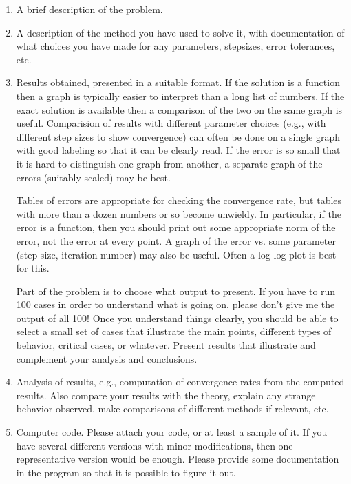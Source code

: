 \documentclass{article}
\begin{document}
\vskip 5pt
\begin{enumerate} 
\item A brief description of the problem.

\vskip 4pt
\item A description of the method you have used to solve it, with
documentation of what choices you have made for any parameters, stepsizes,
error tolerances, etc.

\vskip 4pt
\item Results obtained, presented in a suitable format.  If the solution is
a function then a graph is typically easier to interpret than a long list
of numbers.  If the exact solution is available then a comparison of the
two on the same graph is useful.  Comparision of results with different
parameter choices (e.g., with different step sizes to show convergence) can
often be done on a single graph with good labeling so that it can be
clearly read.  If the error is so small that it is hard to distinguish one
graph from another, a separate graph of the errors (suitably scaled) may be
best.  

\vskip 4pt
Tables of errors are appropriate for checking the convergence rate, but
tables with more than a dozen numbers or so become unwieldy.  In
particular, if the error is a function, then you should print out some
appropriate norm of the error, not the error at every point.  A graph of
the error vs. some parameter (step size, iteration number)
may also be useful. Often a log-log plot is best
for this.

\vskip 4pt
Part of the problem is to choose what output to present.  If you have to
run 100 cases in order to understand what is going on, please don't give me
the output of all 100!  Once you understand things clearly, you should be
able to select a small set of cases that illustrate the main points,
different types of behavior, critical cases, or whatever.  Present results
that illustrate and complement your analysis and conclusions.

\vskip 4pt
\item Analysis of results, e.g., computation of convergence rates from the
computed results.  Also compare your results with the theory, explain any
strange behavior observed, make comparisons of different methods if
relevant, etc.

\vskip 4pt
\item Computer code.  Please attach your code, or at least a sample of it.
If you have several different versions with minor modifications, then one
representative version would be enough.  Please provide some documentation
in the program so that it is possible to figure it out.
\end{enumerate} 
\end{document}
